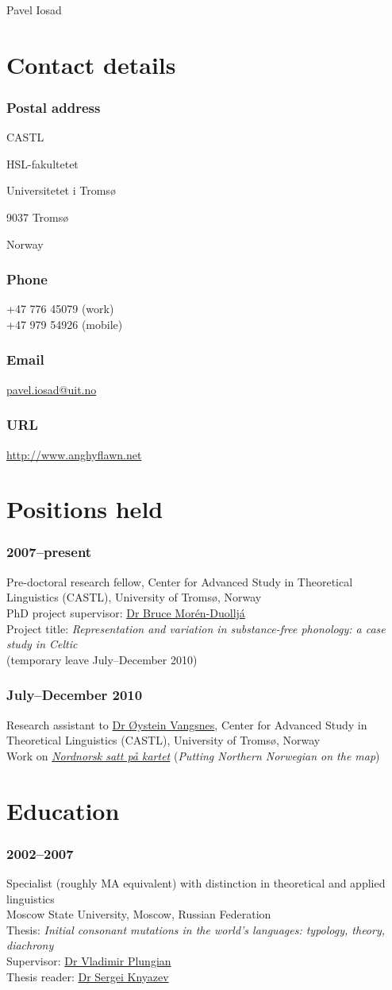 \documentclass[a4paper,11pt]{article}
\newlength\blockwidth
\newcommand\cvitem[1]{\hspace*{\blockwidth}\begin{minipage}[t]{\linewidth-\blockwidth}
#1
\end{minipage}\par}
\newcommand{\block}[2]{\subsubsection{#1}\cvitem{#2}}
\begin{document}
\thispagestyle{plain}
{\Huge{} Pavel Iosad}\\[\baselineskip]

\section{Contact details}

\raggedcolumns

\begin{multicols}{2}
\block{Postal address}{CASTL\par
HSL-fakultetet\par
Universitetet i Tromsø\par
9037 Tromsø\par
Norway}
\block{Phone}{+47 776 45079 (work)\\
+47 979 54926 (mobile)}
\block{Email}{\href{mailto:pavel.iosad@uit.no}{pavel.iosad@uit.no}}
\block{URL}{\href{http://www.anghyflawn.net}{http://www.anghyflawn.net}}
\end{multicols}

\section{Positions held}
\block{2007--present}{Pre-doctoral research fellow, Center for Advanced Study in Theoretical Linguistics (CASTL), University of Troms\o, Norway\\
PhD project supervisor: \href{http://www.hum.uit.no/a/moren}{Dr Bruce Mor\'en-Duollj\'a}\\
Project title: \emph{Representation and variation in substance-free phonology: a case study in Celtic}\\
(temporary leave July--December 2010)
}

\block{July--December 2010}{Research assistant to \href{http://www.hum.uit.no/a/vangsnes}{Dr \O ystein Vangsnes}, Center for Advanced Study in Theoretical Linguistics (CASTL), University of Troms\o, Norway\\
Work on \href{http://nordnorsk.uit.no/}{\textit{Nordnorsk satt på kartet}} (\textit{Putting Northern Norwegian on the map})}

\section{Education}

\block{2002--2007}{Specialist (roughly MA equivalent) with distinction in theoretical and applied linguistics\\
Moscow State University, Moscow, Russian
Federation\\
Thesis: \emph{Initial consonant mutations in the world's languages: typology,  theory, diachrony}\\
Supervisor: \href{http://www.philol.msu.ru/~otipl/new/main/people/plungian.php}{Dr Vladimir Plungian}\\
Thesis reader: \href{http://www.philol.msu.ru/~ruslang/about/employee/knyazev.s.v/}{Dr Sergei Knyazev}}
\end{document}
